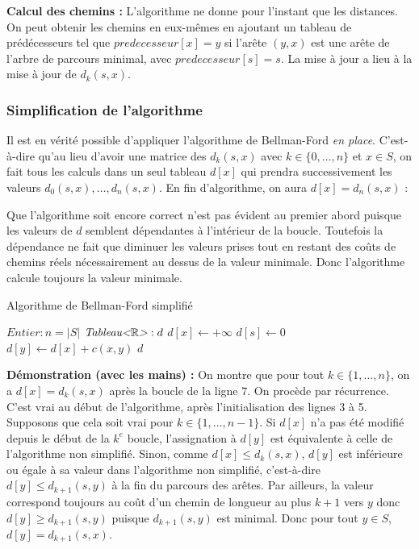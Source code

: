 \documentclass[../../../main.tex]{subfiles}
\begin{document}
\textbf{Calcul des chemins :} L'algorithme ne donne pour l'instant que les distances. On peut obtenir les
chemins en eux-mêmes en ajoutant un tableau de prédécesseurs tel que $predecesseur[x] = y$ si l'arête
$(y, x)$ est une arête de l'arbre de parcours minimal, avec $predecesseur[s] = s$. La mise à jour a lieu à
la mise à jour de $d_k(s, x)$.
\subsubsection{Simplification de l'algorithme}
Il est en vérité possible d'appliquer l'algorithme de Bellman-Ford \textit{en place}. C'est-à-dire qu'au lieu d'avoir une matrice des $d_k(s, x)$ avec $k\in\{0, \dots, n\}$ et $x\in S$, on fait tous les calculs dans un seul tableau $d[x]$ qui prendra successivement les valeurs $d_0(s, x), \dots, d_n(s, x)$. En fin d'algorithme, on aura $d[x] = d_n(s, x)$ :

Que l'algorithme soit encore correct n'est pas évident au premier abord puisque les valeurs de $d$ semblent dépendantes à l'intérieur de la boucle. Toutefois la dépendance ne fait que diminuer les valeurs prises tout en restant des coûts de chemins réels nécessairement au dessus de la valeur minimale. Donc l'algorithme calcule toujours la valeur minimale.

\begin{algorithm}
\caption{Algorithme de Bellman-Ford simplifié\label{alg:bellmanfordsimplifie}}
$Entier:n = |S|$
$\textit{Tableau\textless $\mathbb{R}$\textgreater}:d$
 {
	$d[x]\leftarrow +\infty$\;
}
$d[s]\leftarrow 0$\;
 {
	 {
		 {
			 {
				$d[y] \leftarrow d[x] + c(x, y)$
			}
		}
	}
}
\Return $d$
\end{algorithm}

\textbf{Démonstration (avec les mains) :} On montre que pour tout $k\in\{1, \dots, n\}$, on a $d[x] = d_{k}(s, x)$ après la boucle de la ligne $7$. On procède par récurrence. C'est vrai au début de l'algorithme, après l'initialisation des lignes 3 à 5. Supposons que cela soit vrai pour $k\in \{1, \dots, n-1\}$. Si $d[x]$ n'a pas été modifié depuis le début de la $k^e$ boucle, l'assignation à $d[y]$ est équivalente à celle de l'algorithme non simplifié. Sinon, comme $d[x] \leq d_k(s, x)$, $d[y]$ est inférieure ou égale à sa valeur dans l'algorithme non simplifié, c'est-à-dire $d[y] \leq d_{k+1}(s, y)$ à la fin du parcours des arêtes. Par ailleurs, la valeur correspond toujours au coût d'un chemin de longueur au plus $k+1$ vers $y$ donc $d[y]\geq d_{k+1}(s, y)$ puisque $d_{k+1}(s, y)$ est minimal. Donc pour tout $y\in S$, $d[y] = d_{k+1}(s, x)$.
\end{document}
